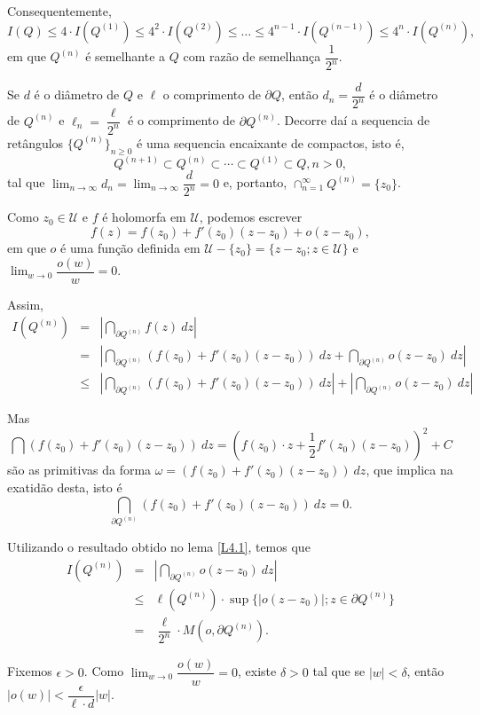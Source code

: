 {Consequentemente,
$$I(Q) \leq 4 \cdot I(Q^{(1)}) \leq 4^2 \cdot I(Q^{(2)}) \leq \ldots \leq 4^{n-1} \cdot I(Q^{(n-1)}) \leq 4^{n} \cdot I(Q^{(n)}),$$
em que $Q^{(n)}$ é semelhante a $Q$ com razão de semelhança $\dfrac{1}{2^n}$.

Se $d$ é o diâmetro de $Q$ e $\ell$ o comprimento de $\partial Q$, então $d_n = \dfrac{d}{2^n}$ é o diâmetro de $Q^{(n)}$ e $\ell_n = \dfrac{\ell}{2^n}$ é o comprimento de $\partial Q^{(n)}$. Decorre daí a sequencia de retângulos $\{Q^{(n)}\}_{n \geq 0}$ é uma sequencia encaixante de compactos, isto é,
$$Q^{(n+1)} \subset Q^{(n)} \subset \cdots \subset Q^{(1)} \subset Q, n > 0,$$
tal que $\displaystyle\lim_{n \to \infty} d_n = \displaystyle\lim_{n \to \infty} \dfrac{d}{2^n} = 0$ e, portanto, $\displaystyle\cap_{n=1}^{\infty} Q^{(n)} = \{z_0\}$.

Como $z_0 \in \mathcal{U}$ e $f$ é holomorfa em $\mathcal{U}$, podemos escrever
$$f(z) = f(z_0)+f'(z_0) (z-z_0)+o(z-z_0),$$
em que $o$ é uma função definida em $\mathcal{U}-\{z_0\} = \{z-z_0; z \in \mathcal{U}\}$ e $\displaystyle\lim_{w \to 0} \dfrac{o(w)}{w} = 0$.

Assim,
$$\begin{array}{rcl}
I(Q^{(n)})
&=& \left|\dint_{\partial Q^{(n)}} f(z) ~dz\right| \\
&=& \left|\dint_{\partial Q^{(n)}} (f(z_0)+f'(z_0) (z- z_0)) ~dz + \dint_{\partial Q^{(n)}} o(z-z_0) ~dz\right| \\
&\leq& \left|\dint_{\partial Q^{(n)}} (f(z_0)+f'(z_0) (z-z_0)) ~dz\right| + \left|\dint_{\partial Q^{(n)}} o(z-z_0) ~dz\right|
\end{array}$$

Mas
$$\dint (f(z_0)+f'(z_0) (z-z_0)) ~dz = (f(z_0) \cdot z+\dfrac{1}{2} f'(z_0) (z-z_0))^2 + C$$
são as primitivas da forma $\omega = (f(z_0)+f'(z_0) (z-z_0)) ~dz$, que implica na exatidão desta, isto é
$$\dint_{\partial Q^{(n)}} (f(z_0)+f'(z_0) (z-z_0)) ~dz = 0.$$

Utilizando o resultado obtido no lema {\ref{L4.1}}, temos que
$$\begin{array}{rcl}
I(Q^{(n)})
&=& \left|\dint_{\partial Q^{(n)}} o(z-z_0) ~dz\right| \\
&\leq& \ell(Q^{(n)}) \cdot \sup\{|o(z-z_0)|; z \in \partial Q^{(n)}\} \\
&=& \dfrac{\ell}{2^n} \cdot M(o, \partial Q^{(n)}).
\end{array}$$

Fixemos $\epsilon > 0$. Como $\displaystyle\lim_{w \to 0} \dfrac{o(w)}{w} = 0$, existe $\delta > 0$ tal que se $|w|<\delta$, então $|o(w)| < \dfrac{\epsilon}{\ell \cdot d} |w|$.

}
